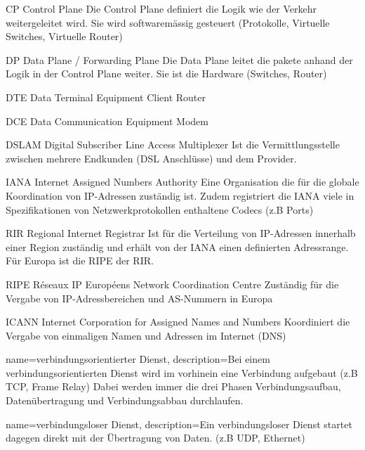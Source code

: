 {CP}
{Control Plane}
{
	Die Control Plane definiert die Logik wie der Verkehr weitergeleitet wird. Sie wird softwaremässig gesteuert (Protokolle, Virtuelle Switches, Virtuelle Router)
}

{DP}
{Data Plane / Forwarding Plane}
{
	Die Data Plane leitet die pakete anhand der Logik in der Control Plane weiter. Sie ist die Hardware (Switches, Router)
}

{DTE}
{Data Terminal Equipment}
{Client Router}

{DCE}
{Data Communication Equipment}
{Modem}

{DSLAM}
{Digital Subscriber Line Access Multiplexer}
{Ist die Vermittlungsstelle zwischen mehrere Endkunden (DSL Anschlüsse) und dem Provider.}

{IANA}
{Internet Assigned Numbers Authority}
{Eine Organisation die für die globale Koordination von IP-Adressen zuständig ist. Zudem registriert die IANA viele in Spezifikationen von Netzwerkprotokollen enthaltene Codecs (z.B Ports)}

{RIR}
{Regional Internet Registrar}
{Ist für die Verteilung von IP-Adressen innerhalb einer Region zuständig und erhält von der IANA einen definierten Adressrange. Für Europa ist die RIPE der RIR.}

{RIPE}
{Réseaux IP Européens Network Coordination Centre}
{Zuständig für die Vergabe von IP-Adressbereichen und AS-Nummern in Europa}

{ICANN}
{Internet Corporation for Assigned Names and Numbers}
{Koordiniert die Vergabe von einmaligen Namen und Adressen im Internet (DNS)}

{
	name={verbindungsorientierter Dienst},
	description={Bei einem verbindungsorientierten Dienst wird im vorhinein eine Verbindung aufgebaut (z.B TCP, Frame Relay) Dabei werden immer die drei Phasen Verbindungsaufbau, Datenübertragung und Verbindungsabbau durchlaufen. }
}

{
	name={verbindungsloser Dienst},
	description={Ein verbindungsloser Dienst startet dagegen direkt mit der Übertragung von Daten. (z.B UDP, Ethernet)}
}